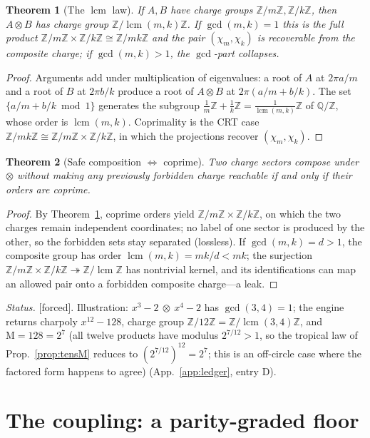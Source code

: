 \documentclass[11pt]{article}
\newtheorem{theorem}{Theorem}[section]
\theoremstyle{definition}
\theoremstyle{remark}
\newcommand{\Mah}{\mathrm{M}}
\newcommand{\Z}{\mathbb{Z}}
\newcommand{\Q}{\mathbb{Q}}
\newcommand{\tens}{\otimes}
\newcommand{\Zmod}[1]{\Z/#1\Z}
\newcommand{\status}[1]{{\small\textsf{[#1]}}}
\newcommand{\forced}{\status{forced}}
\begin{document}
\begin{theorem}[The $\operatorname{lcm}$ law]\label{thm:lcm}
If $A,B$ have charge groups $\Zmod m,\Zmod k$, then $A\tens B$ has charge group
$\Zmod{\operatorname{lcm}(m,k)}$. If $\gcd(m,k)=1$ this is the full product
$\Zmod m\times\Zmod k\cong\Zmod{mk}$ and the pair $(\chi_m,\chi_k)$ is recoverable from the
composite charge; if $\gcd(m,k)>1$, the $\gcd$-part collapses.
\end{theorem}
\begin{proof}
Arguments add under multiplication of eigenvalues: a root of $A$ at $2\pi a/m$ and a root of
$B$ at $2\pi b/k$ produce a root of $A\tens B$ at $2\pi(a/m+b/k)$. The set
$\{a/m+b/k\bmod 1\}$ generates the subgroup $\tfrac1m\Z+\tfrac1k\Z=\tfrac1{\operatorname{lcm}(m,k)}\Z$
of $\Q/\Z$, whose order is $\operatorname{lcm}(m,k)$. Coprimality is the CRT case
$\Zmod{mk}\cong\Zmod m\times\Zmod k$, in which the projections recover $(\chi_m,\chi_k)$.
\end{proof}

\begin{theorem}[Safe composition $\Leftrightarrow$ coprime]\label{thm:safe}
Two charge sectors compose under $\tens$ without making any previously forbidden charge
reachable if and only if their orders are coprime.
\end{theorem}
\begin{proof}
By Theorem~\ref{thm:lcm}, coprime orders yield $\Zmod m\times\Zmod k$, on which the two
charges remain independent coordinates; no label of one sector is produced by the other, so
the forbidden sets stay separated (lossless). If $\gcd(m,k)=d>1$, the composite group has
order $\operatorname{lcm}(m,k)=mk/d<mk$; the surjection
$\Zmod m\times\Zmod k\twoheadrightarrow\Zmod{\operatorname{lcm}}$ has nontrivial kernel, and
its identifications can map an allowed pair onto a forbidden composite charge---a leak.
\end{proof}
\emph{Status.} \forced{}. Illustration: $x^3-2\ \tens\ x^4-2$ has $\gcd(3,4)=1$; the engine
returns charpoly $x^{12}-128$, charge group $\Zmod{12}=\Zmod{\operatorname{lcm}(3,4)}$, and
$\Mah=128=2^{7}$ (all twelve products have modulus $2^{7/12}>1$, so the tropical law of
Prop.~\ref{prop:tensM} reduces to $(2^{7/12})^{12}=2^{7}$; this is an off-circle case where the
factored form happens to agree) (App.~\ref{app:ledger}, entry D).

\section{The coupling: a parity-graded floor}\label{sec:floor}
\end{document}
